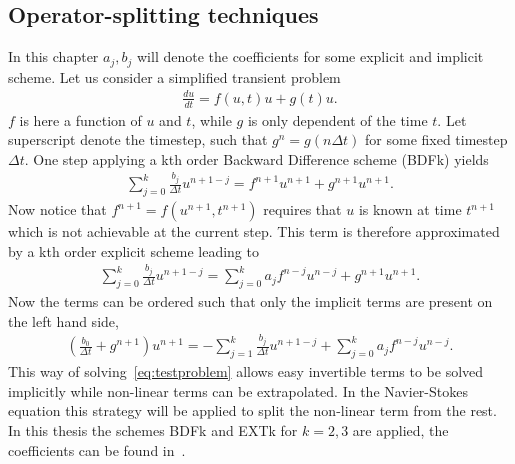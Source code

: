 \subsection{Operator-splitting techniques } \label{opsplitting}
In this chapter $a_j,b_j$ will denote the coefficients for some explicit and implicit scheme.
Let us consider a simplified transient problem 
\begin{align}
    \frac{du}{dt} = f(u,t)u + g(t)u.
    \label{eq:testproblem}
\end{align}
$f$ is here a function of $u$ and $t$, while $g$ is only dependent of the time $t$. Let superscript denote the timestep, 
such that $g^{n}=g(n\Delta t)$ for some fixed timestep $\Delta t$. One step applying a kth order
Backward Difference scheme (BDFk) yields
%
\begin{align}
    \sum_{j = 0}^{k} \frac{b_j}{\Delta t} u^{n+1-j} =f^{n+1}u^{n+1}+g^{n+1}u^{n+1}.
    \label{eq:imp}
\end{align}
%
Now notice that $f^{n+1}=f(u^{n+1},t^{n+1})$ requires that $u$ is known at time $t^{n+1}$ which is not achievable at the current 
step. This term is therefore approximated by a kth order explicit scheme leading to 
%
\begin{align}
    \sum_{j = 0}^{k} \frac{b_j}{\Delta t} u^{n+1-j} =\sum_{j = 0}^{k} a_j f^{n-j}u^{n-j}+g^{n+1}u^{n+1}.
    \label{eq:imp-exp}
\end{align}
%
Now the terms can be ordered such that only the implicit terms are present on the left hand side, 
%
\begin{align}
    (\frac{b_0}{\Delta t} +g^{n+1})u^{n+1} =-\sum_{j = 1}^{k} \frac{b_j}{\Delta t} u^{n+1-j}+\sum_{j = 0}^{k} a_j f^{n-j}u^{n-j}.
    \label{eq:imp-exp-ord}
\end{align}
%
This way of solving~\ref{eq:testproblem} allows easy invertible terms to be solved implicitly while non-linear terms can be extrapolated.
In the Navier-Stokes equation this strategy will be applied to split the non-linear term from the rest.
In this thesis the schemes BDFk and EXTk for $k=2,3$ are applied, the coefficients can be found in~\cite{Nek}. 

